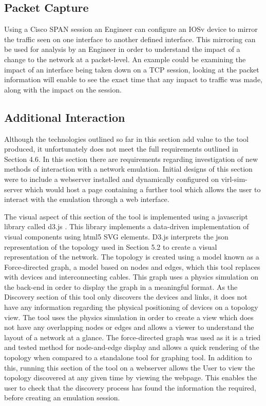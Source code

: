 \documentclass[11pt]{report}
\begin{document}
\subsection{Packet Capture}

Using a Cisco SPAN session an Engineer can configure an IOSv device to mirror the traffic seen on one interface to another defined interface. This mirroring can be used for analysis by an Engineer in order to understand the impact of a change to the network at a packet-level. An example could be examining the impact of an interface being taken down on a TCP session, looking at the packet information will enable to see the exact time that any impact to traffic was made, along with the impact on the session. 

\subsection{Additional Interaction}

Although the technologies outlined so far in this section add value to the tool produced, it unfortunately does not meet the full requirements outlined in Section 4.6. In this section there are requirements regarding investigation of new methods of interaction with a network emulation. Initial designs of this section were to include a webserver installed and dynamically configured on virl-sim-server which would host a page containing a further tool which allows the user to interact with the emulation through a web interface.

The visual aspect of this section of the tool is implemented using a javascript library called d3.js \citep{d3}. This library implements a data-driven implementation of visual components using html5 SVG elements. D3.js interprets the json representation of the topology used in Section 5.2 to create a visual representation of the network. The topology is created using a model known as a Force-directed graph, a model based on nodes and edges, which this tool replaces with devices and interconnecting cables. This graph uses a physics simulation on the back-end in order to display the graph in a meaningful format. As the Discovery section of this tool only discovers the devices and links, it does not have any information regarding the physical positioning of devices on a topology view. The tool uses the physics simulation in order to create a view which does not have any overlapping nodes or edges and allows a viewer to understand the layout of a network at a glance. The force-directed graph was used as it is a tried and tested method for node-and-edge display and allows a quick rendering of the topology when compared to a standalone tool for graphing tool. In addition to this, running this section of the tool on a webserver allows the User to view the topology discovered at any given time by viewing the webpage. This enables the user to check that the discovery process has found the information the required, before creating an emulation session.
\end{document}
